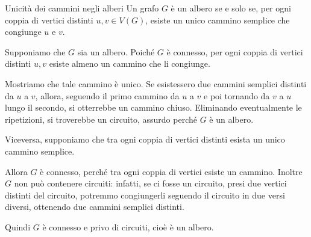 \documentclass[a4paper]{article}
\begin{document}
\begin{snippetproposition}{Unicità dei cammini negli alberi}
    Un grafo \(G\) è un albero se e solo se, per ogni coppia di vertici distinti \(u,v\in V(G)\), esiste un unico cammino semplice che congiunge \(u\) e \(v\).
\end{snippetproposition}

\begin{snippetproof}{}
    \begin{iffproof}
        \item Supponiamo che \(G\) sia un albero. Poiché \(G\) è connesso, per ogni coppia di vertici distinti \(u,v\) esiste almeno un cammino che li congiunge.

        Mostriamo che tale cammino è unico. Se esistessero due cammini semplici distinti da \(u\) a \(v\), allora, seguendo il primo cammino da \(u\) a \(v\) e poi tornando da \(v\) a \(u\) lungo il secondo, si otterrebbe un cammino chiuso. Eliminando eventualmente le ripetizioni, si troverebbe un circuito, assurdo perché \(G\) è un albero.

        \item Viceversa, supponiamo che tra ogni coppia di vertici distinti esista un unico cammino semplice.

        Allora \(G\) è connesso, perché tra ogni coppia di vertici esiste un cammino. Inoltre \(G\) non può contenere circuiti: infatti, se ci fosse un circuito, presi due vertici distinti del circuito, potremmo congiungerli seguendo il circuito in due versi diversi, ottenendo due cammini semplici distinti.

        Quindi \(G\) è connesso e privo di circuiti, cioè è un albero.
    \end{iffproof}
\end{snippetproof}
\end{document}
